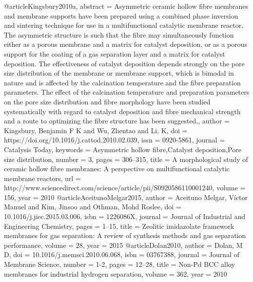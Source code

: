 @article{Kingsbury2010a,
abstract = {Asymmetric ceramic hollow fibre membranes and membrane supports have been prepared using a combined phase inversion and sintering technique for use in a multifunctional catalytic membrane reactor. The asymmetric structure is such that the fibre may simultaneously function either as a porous membrane and a matrix for catalyst deposition, or as a porous support for the coating of a gas separation layer and a matrix for catalyst deposition. The effectiveness of catalyst deposition depends strongly on the pore size distribution of the membrane or membrane support, which is bimodal in nature and is affected by the calcination temperature and the fibre preparation parameters. The effect of the calcination temperature and preparation parameters on the pore size distribution and fibre morphology have been studied systematically with regard to catalyst deposition and fibre mechanical strength and a route to optimizing the fibre structure has been suggested.},
author = {Kingsbury, Benjamin F K and Wu, Zhentao and Li, K},
doi = {https://doi.org/10.1016/j.cattod.2010.02.039},
issn = {0920-5861},
journal = {Catalysis Today},
keywords = {Asymmetric hollow fibre,Catalyst deposition,Pore size distribution},
number = {3},
pages = {306--315},
title = {{A morphological study of ceramic hollow fibre membranes: A perspective on multifunctional catalytic membrane reactors}},
url = {http://www.sciencedirect.com/science/article/pii/S0920586110001240},
volume = {156},
year = {2010}
}
@article{AceitunoMelgar2015,
author = {{Aceituno Melgar}, V{\'{i}}ctor Manuel and Kim, Jinsoo and Othman, Mohd Roslee},
doi = {10.1016/j.jiec.2015.03.006},
isbn = {1226086X},
journal = {Journal of Industrial and Engineering Chemistry},
pages = {1--15},
title = {{Zeolitic imidazolate framework membranes for gas separation: A review of synthesis methods and gas separation performance}},
volume = {28},
year = {2015}
}
@article{Dolan2010,
author = {Dolan, M D},
doi = {10.1016/j.memsci.2010.06.068},
isbn = {03767388},
journal = {Journal of Membrane Science},
number = {1-2},
pages = {12--28},
title = {{Non-Pd BCC alloy membranes for industrial hydrogen separation}},
volume = {362},
year = {2010}
}
